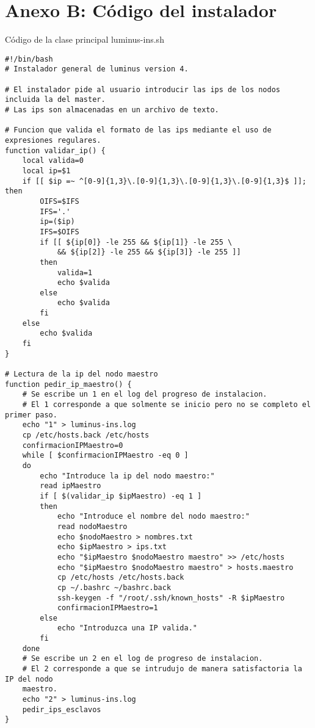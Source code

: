 \section{Anexo B: Código del instalador}
Código de la clase principal luminus-ins.sh
\begin{lstlisting} 
#!/bin/bash
# Instalador general de luminus version 4.

# El instalador pide al usuario introducir las ips de los nodos incluida la del master.
# Las ips son almacenadas en un archivo de texto.

# Funcion que valida el formato de las ips mediante el uso de expresiones regulares.
function validar_ip() {
	local valida=0
	local ip=$1
	if [[ $ip =~ ^[0-9]{1,3}\.[0-9]{1,3}\.[0-9]{1,3}\.[0-9]{1,3}$ ]]; then
	    OIFS=$IFS
	    IFS='.'
	    ip=($ip)
	    IFS=$OIFS
	    if [[ ${ip[0]} -le 255 && ${ip[1]} -le 255 \
	        && ${ip[2]} -le 255 && ${ip[3]} -le 255 ]]
	    then
	    	valida=1
	    	echo $valida
	    else
	    	echo $valida
	    fi
	else
		echo $valida
	fi
}

# Lectura de la ip del nodo maestro
function pedir_ip_maestro() {
	# Se escribe un 1 en el log del progreso de instalacion.
	# El 1 corresponde a que solmente se inicio pero no se completo el primer paso.
	echo "1" > luminus-ins.log
	cp /etc/hosts.back /etc/hosts
	confirmacionIPMaestro=0
	while [ $confirmacionIPMaestro -eq 0 ]
	do
		echo "Introduce la ip del nodo maestro:"
		read ipMaestro
		if [ $(validar_ip $ipMaestro) -eq 1 ]
		then
			echo "Introduce el nombre del nodo maestro:"
			read nodoMaestro
			echo $nodoMaestro > nombres.txt
			echo $ipMaestro > ips.txt
			echo "$ipMaestro $nodoMaestro maestro" >> /etc/hosts
			echo "$ipMaestro $nodoMaestro maestro" > hosts.maestro
			cp /etc/hosts /etc/hosts.back
			cp ~/.bashrc ~/bashrc.back
			ssh-keygen -f "/root/.ssh/known_hosts" -R $ipMaestro
			confirmacionIPMaestro=1
		else	
			echo "Introduzca una IP valida."
		fi
	done
	# Se escribe un 2 en el log de progreso de instalacion.
	# El 2 corresponde a que se intrudujo de manera satisfactoria la IP del nodo 
	maestro.
	echo "2" > luminus-ins.log
	pedir_ips_esclavos
}


\end{lstlisting}
